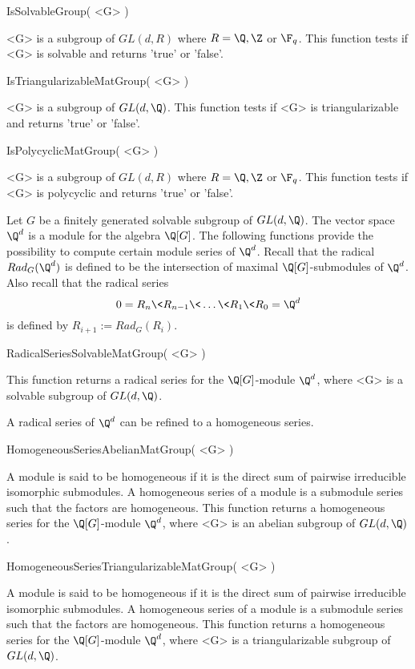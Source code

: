 \> IsSolvableGroup( <G> )

<G> is  a subgroup of $GL(d,R)$ where $R=\Q,\Z $ or $\F_q$.
This function tests if <G> is
solvable and returns 'true' or 'false'. 

\> IsTriangularizableMatGroup( <G> )

<G> is  a subgroup of $GL(d,\Q)$.
 This function tests if <G> is triangularizable 
and returns 'true' or 'false'. 

\> IsPolycyclicMatGroup( <G> )

<G> is  a subgroup of $GL(d,R)$ where $R=\Q,\Z $ or $\F_q$.
This function tests if <G> is
polycyclic and returns 'true' or 'false'.


Let $G$ be a finitely generated solvable subgroup of $GL(d,\Q)$. The vector
space $\Q^d$ is a module for the algebra $\Q[G]$. The following
functions provide the possibility to compute certain module series of
$\Q^d$. Recall that the radical $Rad_G(\Q^d)$ is defined to be the
intersection of maximal $\Q[G]$-submodules of $\Q^d$. Also recall that the
radical series 
$$
0=R_n \< R_{n-1} \< \dots \< R_1 \< R_0=\Q^d 
$$
is defined by $R_{i+1}:= Rad_G(R_i)$. 

\> RadicalSeriesSolvableMatGroup( <G> )

This function returns a 
radical series for the $\Q[G]$-module $\Q^d$, where <G> is a
solvable subgroup of $GL(d,\Q)$.

A radical series of $\Q^d$ can be refined to a homogeneous series.

\> HomogeneousSeriesAbelianMatGroup( <G> )

A module is said to be homogeneous if it is the direct sum of pairwise
irreducible isomorphic submodules. A homogeneous series of a module 
is a submodule series such that the factors are homogeneous.
This function returns a 
homogeneous series for the $\Q[G]$-module $\Q^d$, where <G> is an
abelian subgroup of $GL(d,\Q)$.  

\> HomogeneousSeriesTriangularizableMatGroup( <G> )

A module is said to be homogeneous if it is the direct sum of pairwise
irreducible isomorphic submodules. A homogeneous series of a module 
is a submodule series such that the factors are homogeneous.
This function returns a 
homogeneous series for the $\Q[G]$-module $\Q^d$, where <G> is a
triangularizable subgroup of $GL(d,\Q)$.  

